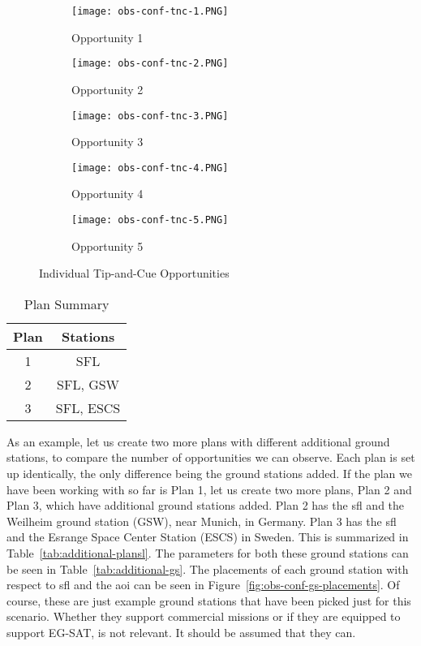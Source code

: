 \begin{figure}[h]
    \centering
    \begin{subfigure}[b]{0.3\textwidth}
	\centering
	\texttt{[image: obs-conf-tnc-1.PNG]} 
	\caption{Opportunity 1}
	\label{fig:obs-conf-tnc-1} 
    \end{subfigure}
    \hfill
    \begin{subfigure}[b]{0.3\textwidth}
	\centering
	\texttt{[image: obs-conf-tnc-2.PNG]} 
	\caption{Opportunity 2}
	\label{fig:obs-conf-tnc-2} 
    \end{subfigure}
    \hfill
    \begin{subfigure}[b]{0.3\textwidth}
	\centering
	\texttt{[image: obs-conf-tnc-3.PNG]} 
	\caption{Opportunity 3}
	\label{fig:obs-conf-tnc-3} 
    \end{subfigure}
    
    \begin{subfigure}[b]{0.3\textwidth}
	\centering
	\texttt{[image: obs-conf-tnc-4.PNG]} 
	\caption{Opportunity 4}
	\label{fig:obs-conf-tnc-4} 
    \end{subfigure}
    \quad \quad
    \begin{subfigure}[b]{0.3\textwidth}
	\centering
	\texttt{[image: obs-conf-tnc-5.PNG]} 
	\caption{Opportunity 5}
	\label{fig:obs-conf-tnc-5} 
    \end{subfigure}

    \caption{Individual Tip-and-Cue Opportunities}
\label{fig:obs-conf-tnc-opps}
\end{figure}

\begin{table}[h] 
    \centering
    \caption{Plan Summary}
    \begin{tabular}{cc}
	Plan & Stations \\ \hline
	1   &	SFL \\
	2   &	SFL, GSW \\
	3   &	SFL, ESCS 
    \end{tabular}
    \label{tab:additional-plans}
\end{table}

As an example, let us create two more plans with different additional ground
stations, to compare the number of opportunities we can observe. Each plan is
set up identically, the only difference being the ground stations added. If the
plan we have been working with so far is Plan 1, let us create two more plans,
Plan 2 and Plan 3, which have additional ground stations added.  Plan 2 has the
\gls{sfl} and the Weilheim ground station (GSW), near Munich, in Germany. Plan
3 has the \gls{sfl} and the Esrange Space Center Station (ESCS) in Sweden. This
is summarized in Table~\ref{tab:additional-plansl}. The parameters for both
these ground stations can be seen in Table~\ref{tab:additional-gs}. The
placements of each ground station with respect to \gls{sfl} and the \gls{aoi}
can be seen in Figure~\ref{fig:obs-conf-gs-placements}. Of course, these are
just example ground stations that have been picked just for this scenario.
Whether they support commercial missions or if they are equipped to support
EG-SAT, is not relevant.  It should be assumed that they can. 

